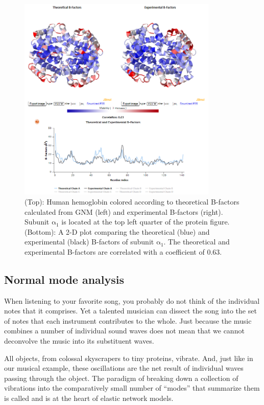 \begin{figure}[h]
	\centering
	\mySfFamily
	\includegraphics[width = 0.85\textwidth]{../images/hemoglobin_b_factors.png}
	\caption{(Top): Human hemoglobin colored according to theoretical B-factors calculated from GNM (left) and experimental B-factors (right). Subunit $\text{α}_\text{1}$ is located at the top left quarter of the protein figure. (Bottom): A 2-D plot comparing the theoretical (blue) and experimental (black) B-factors of subunit $\text{α}_\text{1}$.  The theoretical and experimental B-factors are correlated with a coefficient of 0.63.}
	\label{fig:hemoglobin_b_factors}
\end{figure}

\FloatBarrier
{}
\subsection{Normal mode analysis}

When listening to your favorite song, you probably do not think of the individual notes that it comprises. Yet a talented musician can dissect the song into the set of notes that each instrument contributes to the whole. Just because the music combines a number of individual sound waves does not mean that we cannot deconvolve the music into its substituent waves.

All objects, from colossal skyscrapers to tiny proteins, vibrate. And, just like in our musical example, these oscillations are the net result of individual waves passing through the object. The paradigm of breaking down a collection of vibrations into the comparatively small number of ``modes'' that summarize them is called  and is at the heart of elastic network models.

